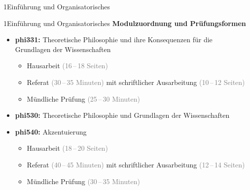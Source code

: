 \documentclass[xcolor=table,9pt,aspectratio=169]{beamer}
\begin{document}
\begin{frame}
\begin{overlayarea}{\textwidth}{0.81\paperheight}{
   \vspace*{11mm}
   \textcolor{uolblue}
   {1\hspace*{1em}Einführung und Organisatorisches}
}
\end{overlayarea}
\end{frame}


\begin{frame}{\vspace*{10mm}1\hspace*{1em}Einführung und Organisatorisches}
\textbf{Modulzuordnung und Prüfungsformen}\\
\begin{itemize}
   \item \textbf{phi331:} Theoretische Philosophie und ihre Konsequenzen für die\\Grundlagen der Wissenschaften
   \begin{itemize}
      \item Hausarbeit \textcolor{gray}{(16\,--\,18 Seiten)}
      \item Referat \textcolor{gray}{(30\,--\,35 Minuten)} mit schriftlicher Ausarbeitung \textcolor{gray}{(10\,--\,12 Seiten)}
      \item Mündliche Prüfung \textcolor{gray}{(25\,--\,30 Minuten)}
   \end{itemize}
   \item \textbf{phi530:} Theoretische Philosophie und Grundlagen der Wissenschaften
   \item \textbf{phi540:} Akzentuierung
   \begin{itemize}
      \item Hausarbeit \textcolor{gray}{(18\,--\,20 Seiten)}
      \item Referat \textcolor{gray}{(40\,--\,45 Minuten)} mit schriftlicher Ausarbeitung \textcolor{gray}{(12\,--\,14 Seiten)}
      \item Mündliche Prüfung \textcolor{gray}{(30\,--\,35 Minuten)}
   \end{itemize}
\end{itemize}
\end{frame}
\end{document}
